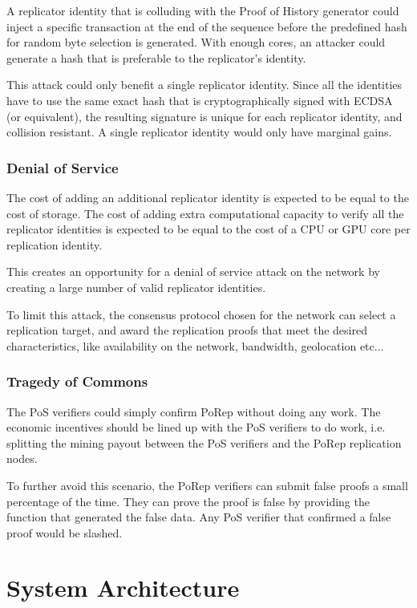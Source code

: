 \documentclass[12pt]{article}
\begin{document}
A replicator identity that is colluding with the Proof of History generator could inject a specific transaction at the end of the sequence before the predefined hash for random byte selection is generated. With enough cores, an attacker could generate a hash that is preferable to the replicator’s identity.

This attack could only benefit a single replicator identity. Since all the identities have to use the same exact hash that is cryptographically signed with ECDSA (or equivalent), the resulting signature is unique for each replicator identity, and collision resistant. A single replicator identity would only have marginal gains.
\subsubsection{Denial of Service}
The cost of adding an additional replicator identity is expected to be equal to the cost of storage. The cost of adding extra computational capacity to verify all the replicator identities is expected to be equal to the cost of a CPU or GPU core per replication identity.

This creates an opportunity for a denial of service attack on the network by creating a large number of valid replicator identities.

To limit this attack, the consensus protocol chosen for the network can select a replication target, and award the replication proofs that meet the desired characteristics, like availability on the network, bandwidth, geolocation etc...
\subsubsection{Tragedy of Commons}

The PoS verifiers could simply confirm PoRep without doing any work. The economic incentives should be lined up with the PoS verifiers to do work, i.e. splitting the mining payout between the PoS verifiers and the PoRep replication nodes.

To further avoid this scenario, the PoRep verifiers can submit false proofs a small percentage of the time. They can prove the proof is false by providing the function that generated the false data. Any PoS verifier that confirmed a false proof would be slashed.

\section{System Architecture}\label{system_architecture}
\end{document}
